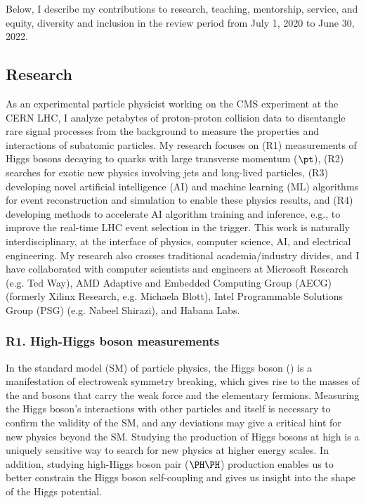 \documentclass[11pt,letterpaper,notitlepage]{article}
\begin{document}
\pagestyle{fancyplain}

Below, I describe my contributions to research, teaching, mentorship, service, and equity, diversity and inclusion in the review period from July 1, 2020 to June 30, 2022.
\vspace{-1ex}
\subsection*{Research}

As an experimental particle physicist working on the CMS experiment at the CERN LHC, I analyze petabytes of proton-proton collision data to disentangle rare signal processes from the background to measure the properties and interactions of subatomic particles.
My research focuses on (R1) measurements of Higgs bosons decaying to quarks with large transverse momentum ($\pt$),
(R2) searches for exotic new physics involving jets and long-lived particles,
(R3) developing novel artificial intelligence (AI) and machine learning (ML) algorithms for event reconstruction and simulation to enable these physics results, and
(R4) developing methods to accelerate AI algorithm training and inference, e.g., to improve the real-time LHC event selection in the trigger.
This work is naturally interdisciplinary, at the interface of physics, computer science, AI, and electrical engineering.
My research also crosses traditional academia/industry divides, and I have collaborated with computer scientists and engineers at Microsoft Research (e.g. Ted Way), AMD Adaptive and Embedded Computing Group (AECG) (formerly Xilinx Research, e.g. Michaela Blott), Intel Programmable Solutions Group (PSG) (e.g. Nabeel Shirazi), and Habana Labs.

\vspace{-1ex}
\subsubsection*{R1. High-\pt Higgs boson measurements}

In the standard model (SM) of particle physics, the Higgs boson (\PH) is a manifestation of electroweak symmetry breaking, which gives rise to the masses of the {\PW} and {\PZ} bosons that carry the weak force and the elementary fermions.
Measuring the Higgs boson's interactions with other particles and itself is necessary to confirm the validity of the SM, and any deviations may give a critical hint for new physics beyond the SM.
Studying the production of Higgs bosons at high \pt is a uniquely sensitive way to search for new physics at higher energy scales.
In addition, studying high-\pt Higgs boson pair ($\PH\PH$) production enables us to better constrain the Higgs boson self-coupling and gives us insight into the shape of the Higgs potential.
\end{document}
